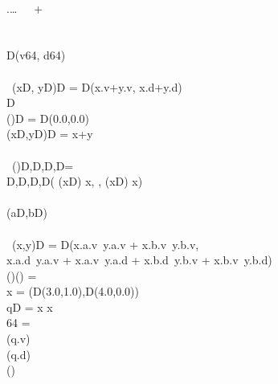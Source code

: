 \documentclass{article}
\begin{document}
\begin{preview}
\begin{FortressCode}
  \\
 .\lbrace\ldots\rbrace {} \lbrace\,\, \, +\,\rbrace \\
  \\
 \\
 D(v\COLON{}64, d\COLON{}64) \\
 \\
\, \mathord{+}(x\COLONOP{}D, y\COLONOP{}D)\COLONOP{}D = D(x.v+y.v, x.d+y.d) \\
   \llbracket{}D\rrbracket \\
\2\+(\ultrathin)\COLONOP{}D = D(0.0,0.0) \\
  (x\COLONOP{}D,y\COLONOP{}D)\COLONOP{}D = x+y\- \\
 \\
\, \mathord{\sum}(\ultrathin)\COLON {}\llbracket{}D,D,D,D\rrbracket = \\
\2\+\llbracket{}D,D,D,D\rrbracket\bigl( (x\COLONOP{}D) \Rightarrow x, ,  (x\COLONOP{}D) \Rightarrow x\bigr) \\
\- \\
 (a\COLONOP{}D,b\COLONOP{}D) \\
 \\
\, \mathord{\cdot}(x\COLON{},y\COLON{})\COLONOP{}D = D(x.a.v\, y.a.v + x.b.v\, y.b.v, \\
\2\+x.a.d\, y.a.v + x.a.v\, y.a.d + x.b.d\, y.b.v + x.b.v\, y.b.d)\- \\
(\ultrathin)\COLON(\ultrathin) =\;  \\
\2\+x = \bigl(D(3.0,1.0),D(4.0,0.0)\bigr) \\
  q\COLONOP{}D = x \cdot x \\
  \COLON{}64 = {\textstyle{}} \\
  (q.v) \\
  (q.d) \\
  ()\- \\
 \\
\end{FortressCode}
\end{preview}
\end{document}
